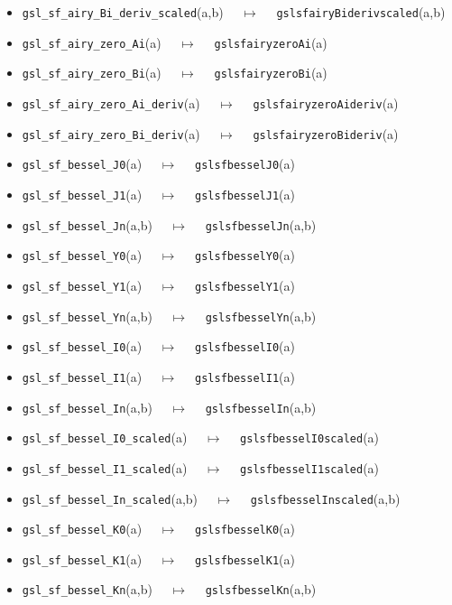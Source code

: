 \documentclass[a4paper,twoside,12pt]{book}
\begin{document}
{\begin{itemize}
\item \texttt{gsl\_sf\_airy\_Bi\_deriv\_scaled}(a,b) $\quad \mapsto\quad $ \texttt{gslsfairyBiderivscaled}(a,b) 
\item \texttt{gsl\_sf\_airy\_zero\_Ai}(a) $\quad \mapsto\quad $ \texttt{gslsfairyzeroAi}(a) 
\item \texttt{gsl\_sf\_airy\_zero\_Bi}(a) $\quad \mapsto\quad $ \texttt{gslsfairyzeroBi}(a) 
\item \texttt{gsl\_sf\_airy\_zero\_Ai\_deriv}(a) $\quad \mapsto\quad $ \texttt{gslsfairyzeroAideriv}(a) 
\item \texttt{gsl\_sf\_airy\_zero\_Bi\_deriv}(a) $\quad \mapsto\quad $ \texttt{gslsfairyzeroBideriv}(a) 
\item \texttt{gsl\_sf\_bessel\_J0}(a) $\quad \mapsto\quad $ \texttt{gslsfbesselJ0}(a) 
\item \texttt{gsl\_sf\_bessel\_J1}(a) $\quad \mapsto\quad $ \texttt{gslsfbesselJ1}(a) 
\item \texttt{gsl\_sf\_bessel\_Jn}(a,b) $\quad \mapsto\quad $ \texttt{gslsfbesselJn}(a,b) 
\item \texttt{gsl\_sf\_bessel\_Y0}(a) $\quad \mapsto\quad $ \texttt{gslsfbesselY0}(a) 
\item \texttt{gsl\_sf\_bessel\_Y1}(a) $\quad \mapsto\quad $ \texttt{gslsfbesselY1}(a) 
\item \texttt{gsl\_sf\_bessel\_Yn}(a,b) $\quad \mapsto\quad $ \texttt{gslsfbesselYn}(a,b) 
\item \texttt{gsl\_sf\_bessel\_I0}(a) $\quad \mapsto\quad $ \texttt{gslsfbesselI0}(a) 
\item \texttt{gsl\_sf\_bessel\_I1}(a) $\quad \mapsto\quad $ \texttt{gslsfbesselI1}(a) 
\item \texttt{gsl\_sf\_bessel\_In}(a,b) $\quad \mapsto\quad $ \texttt{gslsfbesselIn}(a,b) 
\item \texttt{gsl\_sf\_bessel\_I0\_scaled}(a) $\quad \mapsto\quad $ \texttt{gslsfbesselI0scaled}(a) 
\item \texttt{gsl\_sf\_bessel\_I1\_scaled}(a) $\quad \mapsto\quad $ \texttt{gslsfbesselI1scaled}(a) 
\item \texttt{gsl\_sf\_bessel\_In\_scaled}(a,b) $\quad \mapsto\quad $ \texttt{gslsfbesselInscaled}(a,b) 
\item \texttt{gsl\_sf\_bessel\_K0}(a) $\quad \mapsto\quad $ \texttt{gslsfbesselK0}(a) 
\item \texttt{gsl\_sf\_bessel\_K1}(a) $\quad \mapsto\quad $ \texttt{gslsfbesselK1}(a) 
\item \texttt{gsl\_sf\_bessel\_Kn}(a,b) $\quad \mapsto\quad $ \texttt{gslsfbesselKn}(a,b) 

\end{itemize}}
\end{document}
